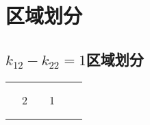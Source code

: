 \chapter{区域划分}

\section{\texorpdfstring{$k_{12} - k_{22} = 1$}的区域划分}

\begin{table}[h]
    \begin{tabular}{|ccccclcl|}
    \hline
    \multicolumn{2}{|c|}{\multirow{3}{*}{}}                          & \multicolumn{6}{c|}{}                                                                                                                                 \\ \cline{3-8} 
    \multicolumn{2}{|c|}{}                                           & \multicolumn{1}{c|}{\multirow{3}{*}{}} & \multicolumn{3}{c|}{\multirow{2}{*}{}}                              & \multicolumn{2}{c|}{\multirow{6}{*}{}} \\
    \multicolumn{2}{|c|}{}                                           & \multicolumn{1}{c|}{}                  & \multicolumn{3}{c|}{}                                               & \multicolumn{2}{c|}{}                  \\ \cline{1-2} \cline{4-6}
    \multicolumn{1}{|c|}{\multirow{3}{*}{}} & \multicolumn{1}{c|}{2} & \multicolumn{1}{c|}{}                  & \multicolumn{1}{c|}{1}     & \multicolumn{2}{c|}{\multirow{3}{*}{}} & \multicolumn{2}{c|}{}                  \\ \cline{2-4}
    \multicolumn{1}{|c|}{}                  & \multicolumn{3}{c|}{\multirow{2}{*}{}}                                                       & \multicolumn{2}{c|}{}                  & \multicolumn{2}{c|}{}                  \\
    \multicolumn{1}{|c|}{}                  & \multicolumn{3}{c|}{}                                                                        & \multicolumn{2}{c|}{}                  & \multicolumn{2}{c|}{}                  \\ \cline{1-6}
    \multicolumn{6}{|c|}{}                                                                                                                                                          & \multicolumn{2}{c|}{}                  \\ \hline
    \end{tabular}
    \end{table}


